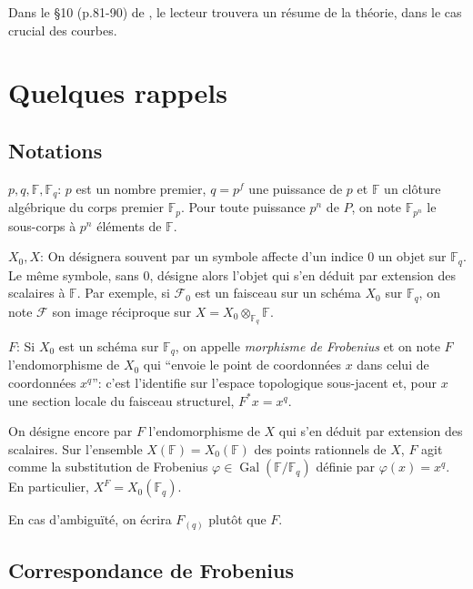 \documentclass{book}
\DeclareMathOperator{\gal}{Gal}
\newcommand{\cF}{\mathcal{F}}
\newcommand{\dF}{\mathbb{F}}
\begin{document}
Dans le \S 10 (p.81-90) de \cite{II:1}, le lecteur trouvera un résume de la 
théorie, dans le cas crucial des courbes. 










\section{Quelques rappels}\label{II:1}





\subsection{Notations}\label{II:1-1}

$p,q,\dF,\dF_q$: $p$ est un nombre premier, $q=p^f$ une puissance de $p$ et 
$\dF$ un clôture algébrique du corps premier $\dF_p$. Pour toute puissance 
$p^n$ de $P$, on note $\dF_{p^n}$ le sous-corps à $p^n$ éléments de $\dF$. 

$X_0,X$: On désignera souvent par un symbole affecte d'un indice $0$ un objet 
sur $\dF_q$. Le même symbole, sans $0$, désigne alors l'objet qui s'en déduit 
par extension des scalaires à $\dF$. Par exemple, si $\cF_0$ est un faisceau 
sur un schéma $X_0$ sur $\dF_q$, on note $\cF$ son image réciproque sur 
$X=X_0\otimes_{\dF_q} \dF$. 

$F$: Si $X_0$ est un schéma sur $\dF_q$, on appelle \emph{morphisme de 
Frobenius} et on note $F$ l'endomorphisme de $X_0$ qui ``envoie le point de 
coordonnées $x$ dans celui de coordonnées $x^q$'': c'est l'identifie sur 
l'espace topologique sous-jacent et, pour $x$ une section locale du faisceau 
structurel, $F^* x = x^q$. 

On désigne encore par $F$ l'endomorphisme de $X$ qui s'en déduit par 
extension des scalaires. Sur l'ensemble $X(\dF) = X_0(\dF)$ des points 
rationnels de $X$, $F$ agit comme la substitution de Frobenius 
$\varphi\in\gal(\dF/\dF_q)$ définie par $\varphi(x)=x^q$. En particulier, 
$X^F=X_0(\dF_q)$. 

En cas d'ambiguïté, on écrira $F_{(q)}$ plutôt que $F$. 










\subsection{Correspondance de Frobenius}\label{II:1-2}
\end{document}
